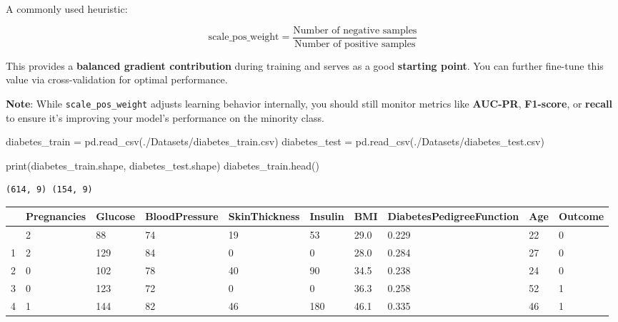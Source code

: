\documentclass[
  letterpaper,
  DIV=11,
  numbers=noendperiod]{scrreprt}
\newenvironment{Shaded}{\begin{snugshade}}{\end{snugshade}}
\newcommand{\BuiltInTok}[1]{\textcolor[rgb]{0.00,0.23,0.31}{#1}}
\newcommand{\NormalTok}[1]{\textcolor[rgb]{0.00,0.23,0.31}{#1}}
\newcommand{\OperatorTok}[1]{\textcolor[rgb]{0.37,0.37,0.37}{#1}}
\newcommand{\StringTok}[1]{\textcolor[rgb]{0.13,0.47,0.30}{#1}}
\begin{document}
A commonly used heuristic:

\[
\text{scale\_pos\_weight} = \frac{\text{Number of negative samples}}{\text{Number of positive samples}}
\]

This provides a \textbf{balanced gradient contribution} during training
and serves as a good \textbf{starting point}. You can further fine-tune
this value via cross-validation for optimal performance.

\textbf{Note}: While \texttt{scale\_pos\_weight} adjusts learning
behavior internally, you should still monitor metrics like
\textbf{AUC-PR}, \textbf{F1-score}, or \textbf{recall} to ensure it's
improving your model's performance on the minority class.

\begin{Shaded}
\begin{Highlighting}[]
\NormalTok{diabetes\_train }\OperatorTok{=}\NormalTok{ pd.read\_csv(}\StringTok{\textquotesingle{}./Datasets/diabetes\_train.csv\textquotesingle{}}\NormalTok{)}
\NormalTok{diabetes\_test }\OperatorTok{=}\NormalTok{ pd.read\_csv(}\StringTok{\textquotesingle{}./Datasets/diabetes\_test.csv\textquotesingle{}}\NormalTok{)}
\end{Highlighting}
\end{Shaded}

\begin{Shaded}
\begin{Highlighting}[]
\BuiltInTok{print}\NormalTok{(diabetes\_train.shape, diabetes\_test.shape)}
\NormalTok{diabetes\_train.head()}
\end{Highlighting}
\end{Shaded}

\begin{verbatim}
(614, 9) (154, 9)
\end{verbatim}

\begin{longtable}[]{@{}llllllllll@{}}
\toprule\noalign{}
& Pregnancies & Glucose & BloodPressure & SkinThickness & Insulin & BMI
& DiabetesPedigreeFunction & Age & Outcome \\
\midrule\noalign{}
\endhead
\bottomrule\noalign{}
\endlastfoot
0 & 2 & 88 & 74 & 19 & 53 & 29.0 & 0.229 & 22 & 0 \\
1 & 2 & 129 & 84 & 0 & 0 & 28.0 & 0.284 & 27 & 0 \\
2 & 0 & 102 & 78 & 40 & 90 & 34.5 & 0.238 & 24 & 0 \\
3 & 0 & 123 & 72 & 0 & 0 & 36.3 & 0.258 & 52 & 1 \\
4 & 1 & 144 & 82 & 46 & 180 & 46.1 & 0.335 & 46 & 1 \\
\end{longtable}
\end{document}
